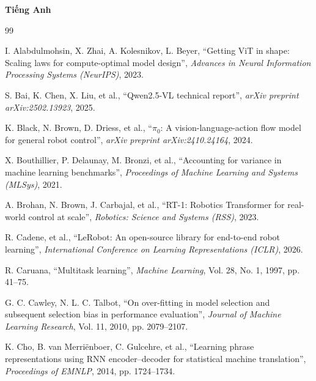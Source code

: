 \documentclass[a4paper,oneside]{report}
\begin{document}
\cleardoublepage
{}
\renewcommand{\bibsection}{\chapter*{TÀI LIỆU THAM KHẢO}}
{\small{}
\noindent\textbf{Tiếng Anh}
\begin{thebibliography}{99}
\setlength{\itemsep}{2pt}

I. Alabdulmohsin, X. Zhai, A. Kolesnikov, L. Beyer, ``Getting ViT in shape: Scaling laws for compute-optimal model design'', \emph{Advances in Neural Information Processing Systems (NeurIPS)}, 2023.

S. Bai, K. Chen, X. Liu, et al., ``Qwen2.5-VL technical report'', \emph{arXiv preprint arXiv:2502.13923}, 2025.

K. Black, N. Brown, D. Driess, et al., ``$\pi_0$: A vision-language-action flow model for general robot control'', \emph{arXiv preprint arXiv:2410.24164}, 2024.

X. Bouthillier, P. Delaunay, M. Bronzi, et al., ``Accounting for variance in machine learning benchmarks'', \emph{Proceedings of Machine Learning and Systems (MLSys)}, 2021.

A. Brohan, N. Brown, J. Carbajal, et al., ``RT-1: Robotics Transformer for real-world control at scale'', \emph{Robotics: Science and Systems (RSS)}, 2023.

R. Cadene, et al., ``LeRobot: An open-source library for end-to-end robot learning'', \emph{International Conference on Learning Representations (ICLR)}, 2026.

R. Caruana, ``Multitask learning'', \emph{Machine Learning}, Vol. 28, No. 1, 1997, pp. 41--75.

G. C. Cawley, N. L. C. Talbot, ``On over-fitting in model selection and subsequent selection bias in performance evaluation'', \emph{Journal of Machine Learning Research}, Vol. 11, 2010, pp. 2079--2107.

K. Cho, B. van Merri\"enboer, C. Gulcehre, et al., ``Learning phrase representations using RNN encoder--decoder for statistical machine translation'', \emph{Proceedings of EMNLP}, 2014, pp. 1724--1734.


\end{thebibliography}}
\end{document}
